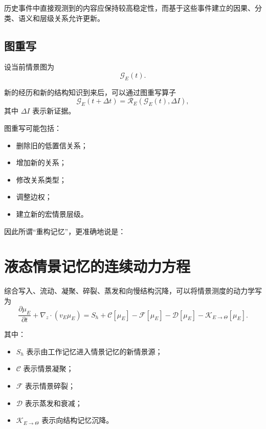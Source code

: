 历史事件中直接观测到的内容应保持较高稳定性，而基于这些事件建立的因果、分类、语义和层级关系允许更新。

\subsection{图重写}

设当前情景图为
\[
\mathcal{G}_E(t).
\]

新的经历和新的结构知识到来后，可以通过图重写算子
\[
\boxed{
\mathcal{G}_E(t+\Delta t)
=
\mathcal{R}_E
\left(
\mathcal{G}_E(t),
\Delta I
\right),
}
\]
其中 $\Delta I$ 表示新证据。

图重写可能包括：

\begin{itemize}
    \item 删除旧的低置信关系；
    \item 增加新的关系；
    \item 修改关系类型；
    \item 调整边权；
    \item 建立新的宏情景层级。
\end{itemize}

因此所谓“重构记忆”，更准确地说是：
\begin{statementbox}
\centering
{}
\end{statementbox}

\section{液态情景记忆的连续动力方程}

综合写入、流动、凝聚、碎裂、蒸发和向慢结构沉降，可以将情景测度的动力学写为
\[
\boxed{
\frac{\partial \mu_E}{\partial t}
+
\nabla_z
\cdot
\left(
v_E\mu_E
\right)
=
S_h
+
\mathcal{C}[\mu_E]
-
\mathcal{F}[\mu_E]
-
\mathcal{D}[\mu_E]
-
\mathcal{K}_{E\rightarrow\Theta}[\mu_E].
}
\]

其中：

\begin{itemize}
    \item $S_h$ 表示由工作记忆进入情景记忆的新情景源；
    \item $\mathcal{C}$ 表示情景凝聚；
    \item $\mathcal{F}$ 表示情景碎裂；
    \item $\mathcal{D}$ 表示蒸发和衰减；
    \item $\mathcal{K}_{E\rightarrow\Theta}$ 表示向结构记忆沉降。
\end{itemize}

